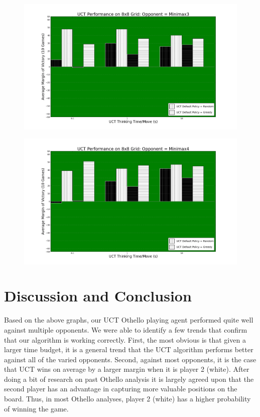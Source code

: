 \documentclass[12pt,letterpaper]{article}
\begin{document}
\begin{figure}[!hp]
\begin{center}
\includegraphics[scale=.4]{88_Minimax3}
\end{center}
\end{figure}

\begin{figure}[!h]
\begin{center}
\includegraphics[scale=.4]{88_Minimax4}
\end{center}
\end{figure}

\pagebreak
\section{Discussion and Conclusion}
\label{conc}
Based on the above graphs, our UCT Othello playing agent performed quite well against multiple opponents. We were able to identify a few trends that confirm that our algorithm is working correctly.  First, the most obvious is that given a larger time budget, it is a general trend that the UCT algorithm performs better against all of the varied opponents. Second, against most opponents, it is the case that UCT wins on average by a larger margin when it is player 2 (white). After doing a bit of research on past Othello analysis it is largely agreed upon that the second player has an advantage in capturing more valuable positions on the board. Thus, in most Othello analyses, player 2 (white) has a higher probability of winning the game. 
\end{document}
